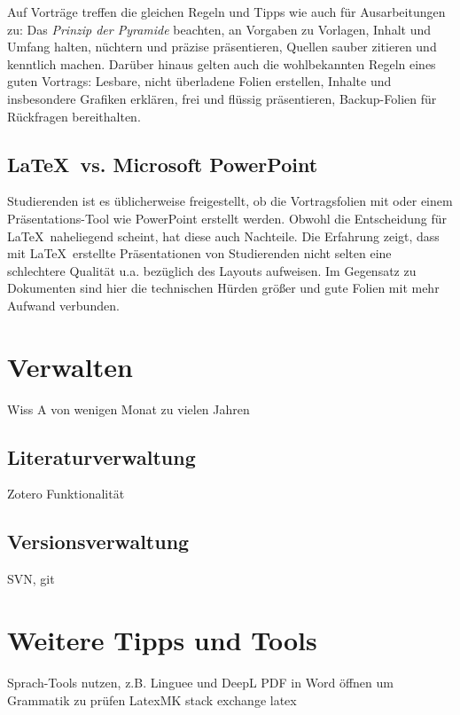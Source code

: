 Auf Vorträge treffen die gleichen Regeln und Tipps wie auch für Ausarbeitungen zu: Das \emph{Prinzip der Pyramide} beachten, an Vorgaben zu Vorlagen, Inhalt und Umfang halten, nüchtern und präzise präsentieren, Quellen sauber zitieren und kenntlich machen. 
Darüber hinaus gelten auch die wohlbekannten Regeln eines guten Vortrags: Lesbare, nicht überladene Folien erstellen, Inhalte und insbesondere Grafiken erklären, frei und flüssig präsentieren, Backup-Folien für Rückfragen bereithalten.

\subsection{\LaTeX\ vs. Microsoft PowerPoint}
\label{sec:Praesentieren:PowerPoint}

Studierenden ist es üblicherweise freigestellt, ob die Vortragsfolien mit  oder einem Präsentations-Tool wie PowerPoint erstellt werden. 
Obwohl die Entscheidung für \LaTeX\ naheliegend scheint, hat diese auch Nachteile. 
Die Erfahrung zeigt, dass mit \LaTeX\ erstellte Präsentationen von Studierenden nicht selten eine schlechtere Qualität u.a. bezüglich des Layouts aufweisen. 
Im Gegensatz zu Dokumenten sind hier die technischen Hürden größer und gute Folien mit mehr Aufwand verbunden.


\section{Verwalten}
\label{sec:Verwalten}

Wiss A von wenigen Monat zu vielen Jahren

\subsection{Literaturverwaltung}

Zotero
Funktionalität

\subsection{Versionsverwaltung}

SVN, git

\section{Weitere Tipps und Tools}

Sprach-Tools nutzen, z.B. Linguee und DeepL
PDF in Word öffnen um Grammatik zu prüfen
LatexMK
stack exchange latex